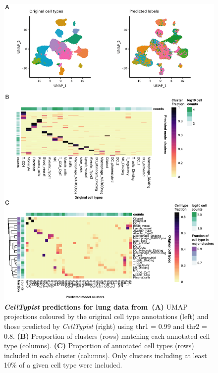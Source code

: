 \begin{figure}[pht!]
\centering
\includegraphics[scale=0.83]{Chapter4/Figs/chap4_preds.png} %
\caption[\textit{CellTypist} predictions for lung data from~\citep{madissoon_lung_2019}]{\textbf{\textit{CellTypist} predictions for lung data from~\citep{madissoon_lung_2019}}\newline\textbf{(A)} UMAP projections coloured by the original cell type annotations (left) and those predicted by \textit{CellTypist} (right) using thr1 = 0.99 and thr2 = 0.8. \textbf{(B)} Proportion of clusters (rows) matching each annotated cell type (columns). \textbf{(C)} Proportion of annotated cell types (rows) included in each cluster (columns). Only clusters including at least 10\% of a given cell type were included.}
\label{fig:chap4_preds}
\end{figure}


